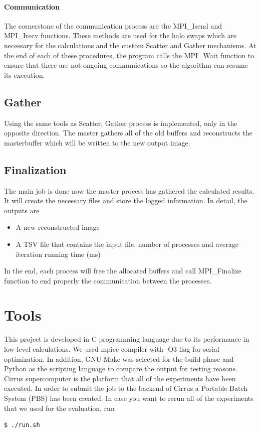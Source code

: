 \documentclass[12pt,a4paper]{article}
\newcommand{\sectionVspacing}{\vspace{15pt}}
\begin{document}
        \paragraph{Communication}
            The cornerstone of the communication process are the MPI\_Isend and MPI\_Irecv functions. These methods are used for the halo swaps which are necessary for the calculations and the custom Scatter and Gather mechanisms. At the end of each of these procedures, the program calls the MPI\_Wait function to ensure that there are not ongoing communications so the algorithm can resume its execution.

    \subsection{Gather}
    	Using the same tools as Scatter, Gather process is implemented, only in the opposite direction. The master gathers all of the old buffers and reconstructs the masterbuffer which will be written to the new output image.

    \subsection{Finalization}
    	The main job is done now the master process has gathered the calculated results. It will create the necessary files and store the logged information. In detail, the outputs are

      \begin{itemize}
		    \item A new reconstructed image
		    \item A TSV file that contains the input file, number of processes and average iteration running time (ms)
		  \end{itemize}

    	In the end, each process will free the allocated buffers and call MPI\_Finalize function to end properly the communication between the processes.

\sectionVspacing
\clearpage

\section{Tools}
	This project is developed in C programming language due to its performance in low-level calculations. We used mpicc compiler with -O3 flag for serial optimization. In addition, GNU Make was selected for the build phase and Python as the scripting language to compare the output for testing reasons. Cirrus supercomputer is the platform that all of the experiments have been executed. In order to submit the job to the backend of Cirrus a Portable Batch System (PBS) has been created. In case you want to rerun all of the experiments that we used for the evaluation, run
  	\begin{lstlisting}[language=bash]
		$ ./run.sh
	\end{lstlisting}
	
\end{document}
